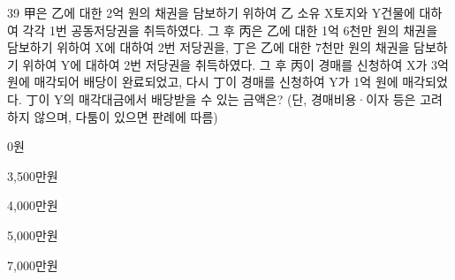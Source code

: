 \begin{question}{39}
甲은 乙에 대한 2억 원의 채권을 담보하기 위하여 乙 소유 X토지와 Y건물에 대하여 각각 1번 공동저당권을 취득하였다. 그 후 丙은 乙에 대한 1억 6천만 원의 채권을 담보하기 위하여 X에 대하여 2번 저당권을, 丁은 乙에 대한 7천만 원의 채권을 담보하기 위하여 Y에 대하여 2번 저당권을 취득하였다. 그 후 丙이 경매를 신청하여 X가 3억 원에 매각되어 배당이 완료되었고, 다시 丁이 경매를 신청하여 Y가 1억 원에 매각되었다. 丁이 Y의 매각대금에서 배당받을 수 있는 금액은? (단, 경매비용·이자 등은 고려하지 않으며, 다툼이 있으면 판례에 따름)
\begin{choices}
  \item 0원
  \item 3,500만원
  \item 4,000만원
  \item 5,000만원
  \item 7,000만원
\end{choices}
\end{question}
